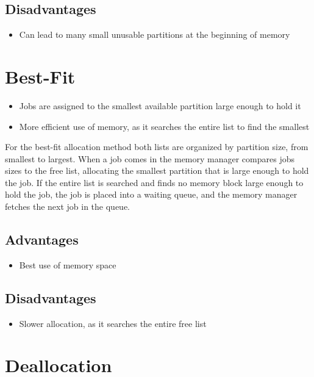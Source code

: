 \documentclass[12pt letter]{report}
\begin{document}
\subsection{Disadvantages}
\begin{itemize}
  \item Can lead to many small unusable partitions at the beginning of memory
\end{itemize}

\section{Best-Fit}


\begin{itemize}
  \item Jobs are assigned to the smallest available partition large enough to hold it
  \item More efficient use of memory, as it searches the entire list to find the smallest
\end{itemize}

For the best-fit allocation method both lists are organized by partition size, from smallest to largest. When a job comes in the memory manager compares jobs sizes to the free list, allocating the smallest partition that is large enough to hold the job. If the entire list is searched and finds no memory block large enough to hold the job, the job is placed into a waiting queue, and the memory manager fetches the next job in the queue.

\subsection{Advantages}
\begin{itemize}
  \item Best use of memory space
\end{itemize}

\subsection{Disadvantages}
\begin{itemize}
  \item Slower allocation, as it searches the entire free list
\end{itemize}

\section{Deallocation}
\end{document}
